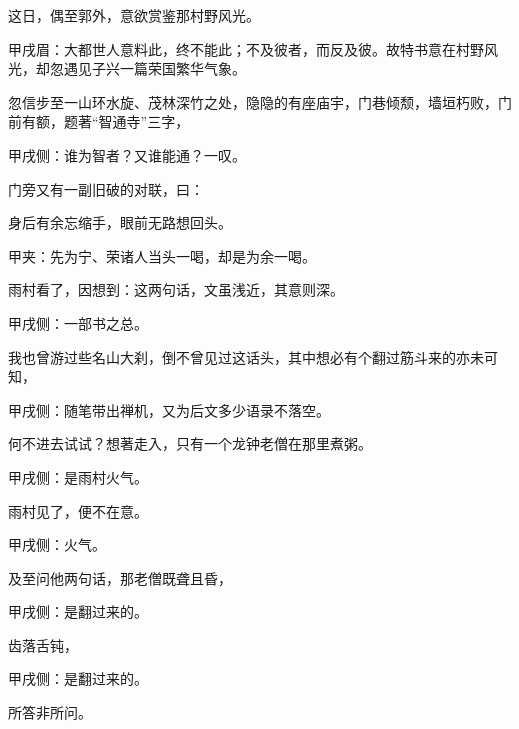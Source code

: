 \begin{parag}
    这日，偶至郭外，意欲赏鉴那村野风光。\begin{note}甲戌眉：大都世人意料此，终不能此；不及彼者，而反及彼。故特书意在村野风光，却忽遇见子兴一篇荣国繁华气象。\end{note}忽信步至一山环水旋、茂林深竹之处，隐隐的有座庙宇，门巷倾颓，墙垣朽败，门前有额，题著“智通寺”三字，\begin{note}甲戌侧：谁为智者？又谁能通？一叹。\end{note}门旁又有一副旧破的对联，曰：
\end{parag}


\begin{poem}
    \begin{pl}身后有余忘缩手，眼前无路想回头。\end{pl}\begin{note}甲夹：先为宁、荣诸人当头一喝，却是为余一喝。\end{note}
\end{poem}


\begin{parag}
    雨村看了，因想到：这两句话，文虽浅近，其意则深。\begin{note}甲戌侧：一部书之总。\end{note}我也曾游过些名山大刹，倒不曾见过这话头，其中想必有个翻过筋斗来的亦未可知，\begin{note}甲戌侧：随笔带出禅机，又为后文多少语录不落空。\end{note}何不进去试试？想著走入，只有一个龙钟老僧在那里煮粥。\begin{note}甲戌侧：是雨村火气。\end{note}雨村见了，便不在意。\begin{note}甲戌侧：火气。\end{note}及至问他两句话，那老僧既聋且昏，\begin{note}甲戌侧：是翻过来的。\end{note}齿落舌钝，\begin{note}甲戌侧：是翻过来的。\end{note}所答非所问。
\end{parag}



